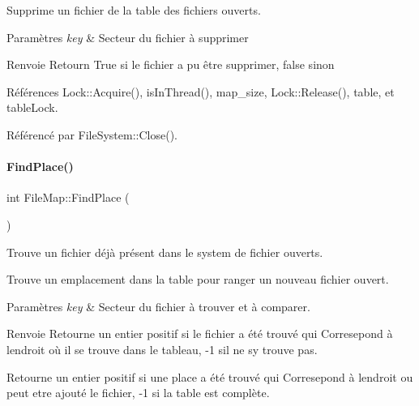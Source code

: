 Supprime un fichier de la table des fichiers ouverts. 


\begin{DoxyParams}{Paramètres}
{\em key} & Secteur du fichier à supprimer \\
\hline
\end{DoxyParams}
\begin{DoxyReturn}{Renvoie}
Retourn True si le fichier a pu être supprimer, false sinon 
\end{DoxyReturn}


Références Lock\+::\+Acquire(), is\+In\+Thread(), map\+\_\+size, Lock\+::\+Release(), table, et table\+Lock.



Référencé par File\+System\+::\+Close().

\hypertarget{class_file_map_aead6784e56bc36eedd7aa16af522cb6e}{}\label{class_file_map_aead6784e56bc36eedd7aa16af522cb6e} 
\paragraph{\texorpdfstring{Find\+Place()}{FindPlace()}}
{\footnotesize\ttfamily int File\+Map\+::\+Find\+Place (\begin{DoxyParamCaption}{ }\end{DoxyParamCaption})\hspace{0.3cm}{\ttfamily [private]}}



Trouve un fichier déjà présent dans le system de fichier ouverts. 

Trouve un emplacement dans la table pour ranger un nouveau fichier ouvert.


\begin{DoxyParams}{Paramètres}
{\em key} & Secteur du fichier à trouver et à comparer. \\
\hline
\end{DoxyParams}
\begin{DoxyReturn}{Renvoie}
Retourne un entier positif si le fichier a été trouvé qui Corresepond à l\textquotesingle{}endroit où il se trouve dans le tableau, -\/1 s\textquotesingle{}il ne s\textquotesingle{}y trouve pas.

Retourne un entier positif si une place a été trouvé qui Corresepond à l\textquotesingle{}endroit ou peut etre ajouté le fichier, -\/1 si la table est complète. 
\end{DoxyReturn}


